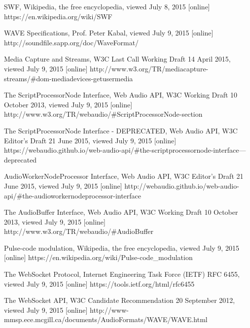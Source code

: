 \begin{thebibliography}{99}
SWF, Wikipedia, the free encyclopedia, viewed July 8, 2015 [online]
https://en.wikipedia.org/wiki/SWF

WAVE Specifications, Prof. Peter Kabal, viewed July 9, 2015 [online]
http://soundfile.sapp.org/doc/WaveFormat/


Media Capture and Streams, W3C Last Call Working Draft 14 April 2015, viewed July 9, 2015 [online]
http://www.w3.org/TR/mediacapture-streams/\#dom-mediadevices-getusermedia

The ScriptProcessorNode Interface, Web Audio API, W3C Working Draft 10 October 2013, viewed July 9, 2015 [online]
http://www.w3.org/TR/webaudio/\#ScriptProcessorNode-section

The ScriptProcessorNode Interface - DEPRECATED, Web Audio API, W3C Editor's Draft 21 June 2015, viewed July 9, 2015 [online]
https://webaudio.github.io/web-audio-api/\#the-scriptprocessornode-interface---deprecated

AudioWorkerNodeProcessor Interface, Web Audio API, W3C Editor's Draft 21 June 2015, viewed July 9, 2015 [online]
http://webaudio.github.io/web-audio-api/\#the-audioworkernodeprocessor-interface	

The AudioBuffer Interface, Web Audio API, W3C Working Draft 10 October 2013, viewed July 9, 2015 [online]
http://www.w3.org/TR/webaudio/\#AudioBuffer

Pulse-code modulation, Wikipedia, the free encyclopedia, viewed July 9, 2015 [online]
https://en.wikipedia.org/wiki/Pulse-code\_modulation

The WebSocket Protocol, Internet Engineering Task Force (IETF) RFC 6455, viewed July 9, 2015 [online]
https://tools.ietf.org/html/rfc6455

The WebSocket API, W3C Candidate Recommendation 20 September 2012, viewed July 9, 2015 [online]
http://www-mmsp.ece.mcgill.ca/documents/AudioFormats/WAVE/WAVE.html


\end{thebibliography}
